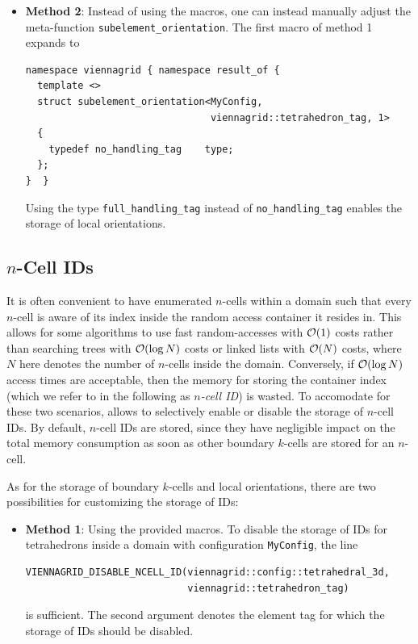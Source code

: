 \begin{itemize}
\begin{itemize}
 \item \textbf{Method 2}: Instead of using the macros, one can instead manually adjust the meta-function \lstinline|subelement_orientation|. The first macro of method 1 expands to
 \begin{lstlisting}
namespace viennagrid { namespace result_of {
  template <>
  struct subelement_orientation<MyConfig,
                                viennagrid::tetrahedron_tag, 1>
  {
    typedef no_handling_tag    type;
  };
}  }
 \end{lstlisting}
Using the type \lstinline|full_handling_tag| instead of \lstinline|no_handling_tag| enables the storage of local orientations.
\end{itemize}


\subsection{$n$-Cell IDs}
It is often convenient to have enumerated $n$-cells within a domain such that every $n$-cell is aware of its index inside the random access container it resides in. This allows for some algorithms to use fast random-accesses with $\mathcal{O}(1)$ costs rather than searching trees with $\mathcal{O}(\log N)$ costs or linked lists with $\mathcal{O}(N)$ costs, where $N$ here denotes the number of $n$-cells inside the domain. Conversely, if $\mathcal{O}(\log N)$ access times are acceptable, then the memory for storing the container index (which we refer to in the following as \emph{$n$-cell ID}) is wasted. To accomodate for these two scenarios, {\ViennaGrid} allows to selectively enable or disable the storage of $n$-cell IDs. By default, $n$-cell IDs are stored, since they have negligible impact on the total memory consumption as soon as other boundary $k$-cells are stored for an $n$-cell.

As for the storage of boundary $k$-cells and local orientations, there are two possibilities for customizing the storage of IDs:
\begin{itemize}
 \item \textbf{Method 1}: Using the provided macros. To disable the storage of IDs for tetrahedrons inside a domain with configuration \lstinline|MyConfig|, the line
 \begin{lstlisting}
VIENNAGRID_DISABLE_NCELL_ID(viennagrid::config::tetrahedral_3d,
                            viennagrid::tetrahedron_tag)
 \end{lstlisting}
 is sufficient. The second argument denotes the element tag for which the storage of IDs should be disabled.


\end{itemize}
\end{itemize}
